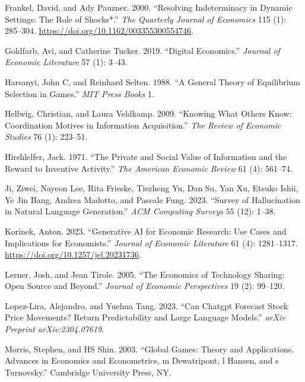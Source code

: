 \documentclass[
]{article}
\newlength{\cslhangindent}
\newenvironment{CSLReferences}[2] %
 {\begin{list}{}{%
  \setlength{\itemindent}{0pt}
  \setlength{\leftmargin}{0pt}
  \setlength{\parsep}{0pt}
  \ifodd #1
   \setlength{\leftmargin}{\cslhangindent}
   \setlength{\itemindent}{-1\cslhangindent}
  \fi
  \setlength{\itemsep}{#2\baselineskip}}}
 {\end{list}}
\theoremstyle{plain}
\theoremstyle{definition}
\theoremstyle{remark}
\begin{document}
\begin{CSLReferences}{1}{0}
Frankel, David, and Ady Pauzner. 2000. {``{Resolving Indeterminacy in
Dynamic Settings: The Role of Shocks*}.''} \emph{The Quarterly Journal
of Economics} 115 (1): 285--304.
\url{https://doi.org/10.1162/003355300554746}.

Goldfarb, Avi, and Catherine Tucker. 2019. {``Digital Economics.''}
\emph{Journal of Economic Literature} 57 (1): 3--43.

Harsanyi, John C, and Reinhard Selten. 1988. {``A General Theory of
Equilibrium Selection in Games.''} \emph{MIT Press Books} 1.

Hellwig, Christian, and Laura Veldkamp. 2009. {``Knowing What Others
Know: Coordination Motives in Information Acquisition.''} \emph{The
Review of Economic Studies} 76 (1): 223--51.

Hirshlelfer, Jack. 1971. {``The Private and Social Value of Information
and the Reward to Inventive Activity.''} \emph{The American Economic
Review} 61 (4): 561--74.

Ji, Ziwei, Nayeon Lee, Rita Frieske, Tiezheng Yu, Dan Su, Yan Xu, Etsuko
Ishii, Ye Jin Bang, Andrea Madotto, and Pascale Fung. 2023. {``Survey of
Hallucination in Natural Language Generation.''} \emph{ACM Computing
Surveys} 55 (12): 1--38.

Korinek, Anton. 2023. {``Generative AI for Economic Research: Use Cases
and Implications for Economists.''} \emph{Journal of Economic
Literature} 61 (4): 1281--1317.
\url{https://doi.org/10.1257/jel.20231736}.

Lerner, Josh, and Jean Tirole. 2005. {``The Economics of Technology
Sharing: Open Source and Beyond.''} \emph{Journal of Economic
Perspectives} 19 (2): 99--120.

Lopez-Lira, Alejandro, and Yuehua Tang. 2023. {``Can Chatgpt Forecast
Stock Price Movements? Return Predictability and Large Language
Models.''} \emph{arXiv Preprint arXiv:2304.07619}.

Morris, Stephen, and HS Shin. 2003. {``Global Games: Theory and
Applications. Advances in Economics and Econometrics, m Dewatripont, l
Hansen, and s Turnovsky.''} Cambridge University Press, NY.


\end{CSLReferences}
\end{document}

